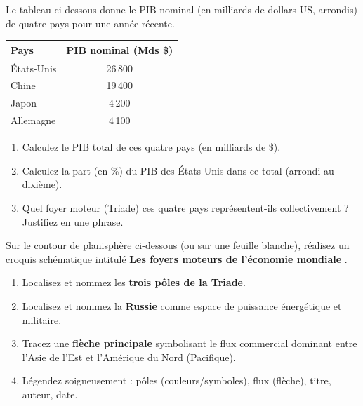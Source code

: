 \documentclass[11pt]{article}
\begin{document}
\begin{exercice}
Le tableau ci-dessous donne le PIB nominal (en milliards de dollars US, arrondis) de quatre pays pour une année récente.
\begin{center}
\begin{tabular}{|l|c|}
\hline
\textbf{Pays} & \textbf{PIB nominal (Mds \$)} \\
\hline
États-Unis & 26\,800 \\
Chine & 19\,400 \\
Japon & 4\,200 \\
Allemagne & 4\,100 \\
\hline
\end{tabular}
\end{center}
\begin{enumerate}
    \item Calculez le PIB total de ces quatre pays (en milliards de \$).
    \item Calculez la part (en \%) du PIB des États-Unis dans ce total (arrondi au dixième).
    \item Quel foyer moteur (Triade) ces quatre pays représentent-ils collectivement ? Justifiez en une phrase.
\end{enumerate}
\end{exercice}

\begin{exercice}
Sur le contour de planisphère ci-dessous (ou sur une feuille blanche), réalisez un croquis schématique intitulé \og \textbf{Les foyers moteurs de l'économie mondiale} \fg.
\begin{enumerate}
    \item Localisez et nommez les \textbf{trois pôles de la Triade}.
    \item Localisez et nommez la \textbf{Russie} comme espace de puissance énergétique et militaire.
    \item Tracez une \textbf{flèche principale} symbolisant le flux commercial dominant entre l'Asie de l'Est et l'Amérique du Nord (Pacifique).
    \item Légendez soigneusement : pôles (couleurs/symboles), flux (flèche), titre, auteur, date.
\end{enumerate}
\end{exercice}
\end{document}

